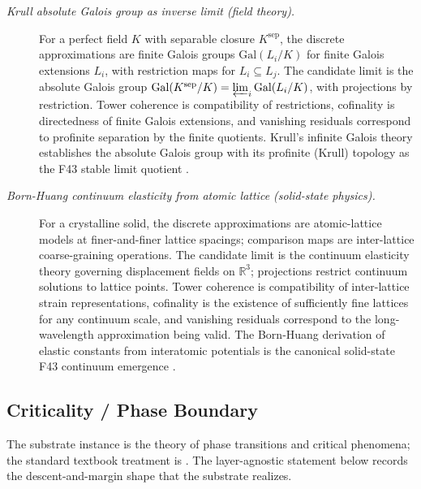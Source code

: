 \documentclass[11pt]{article}
\theoremstyle{definition}
\begin{document}
\begin{description}
\item[\emph{Krull absolute Galois group as inverse
limit (field theory).}]
For a perfect field \(K\) with separable closure
\(K^{\mathrm{sep}}\), the discrete approximations
are finite Galois groups
\(\mathrm{Gal}(L_i/K)\) for finite Galois
extensions \(L_i\), with restriction maps for
\(L_i\subseteq L_j\).  The candidate limit is the
absolute Galois group
\(\mathrm{Gal}(K^{\mathrm{sep}}/K)
=\varprojlim_i\mathrm{Gal}(L_i/K)\), with
projections by restriction.  Tower coherence is
compatibility of restrictions, cofinality is
directedness of finite Galois extensions, and
vanishing residuals correspond to profinite
separation by the finite quotients.  Krull's
infinite Galois theory establishes the absolute
Galois group with its profinite (Krull) topology
as the F43 stable limit quotient
\citep{Krull1928Galois}.

\item[\emph{Born-Huang continuum elasticity from
atomic lattice (solid-state physics).}]
For a crystalline solid, the discrete
approximations are atomic-lattice models at
finer-and-finer lattice spacings; comparison maps
are inter-lattice coarse-graining operations.
The candidate limit is the continuum elasticity
theory governing displacement fields on
\(\mathbb R^3\); projections restrict continuum
solutions to lattice points.  Tower coherence is
compatibility of inter-lattice strain
representations, cofinality is the existence of
sufficiently fine lattices for any continuum
scale, and vanishing residuals correspond to the
long-wavelength approximation being valid.  The
Born-Huang derivation of elastic constants from
interatomic potentials is the canonical
solid-state F43 continuum emergence
\citep{BornHuang1954Dynamical}.
\end{description}

\subsection{Criticality / Phase Boundary}\label{sec:self-reference-limits:criticality}

The substrate instance is the theory of phase transitions and
critical phenomena; the standard textbook treatment is
\citet{Stanley1971PhaseTransitions}.  The layer-agnostic statement
below records the descent-and-margin shape that the substrate
realizes.
\end{document}

